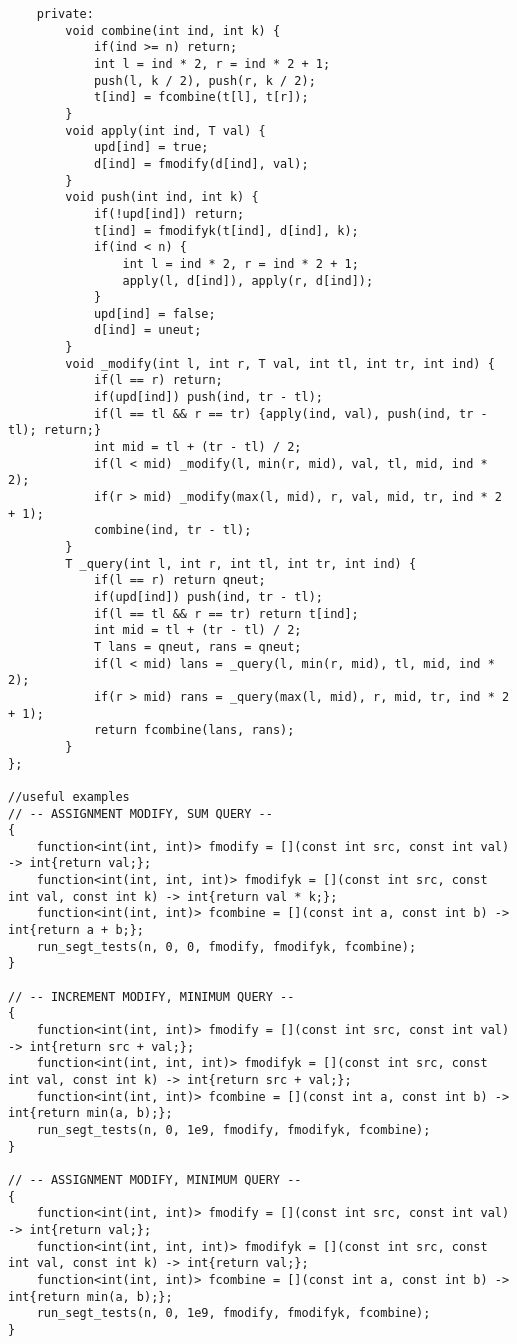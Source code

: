 \documentclass[8pt, headheight=10pt, a4paper]{article}
\begin{document}
\begin{multicols*}{3}
\begin{lstlisting}
    private:
        void combine(int ind, int k) {
            if(ind >= n) return;
            int l = ind * 2, r = ind * 2 + 1;
            push(l, k / 2), push(r, k / 2);
            t[ind] = fcombine(t[l], t[r]);
        }
        void apply(int ind, T val) {
            upd[ind] = true;
            d[ind] = fmodify(d[ind], val);
        }
        void push(int ind, int k) {
            if(!upd[ind]) return;
            t[ind] = fmodifyk(t[ind], d[ind], k);
            if(ind < n) {
                int l = ind * 2, r = ind * 2 + 1;
                apply(l, d[ind]), apply(r, d[ind]);
            }
            upd[ind] = false;
            d[ind] = uneut;
        }
        void _modify(int l, int r, T val, int tl, int tr, int ind) {
            if(l == r) return;
            if(upd[ind]) push(ind, tr - tl);
            if(l == tl && r == tr) {apply(ind, val), push(ind, tr - tl); return;}
            int mid = tl + (tr - tl) / 2;
            if(l < mid) _modify(l, min(r, mid), val, tl, mid, ind * 2);
            if(r > mid) _modify(max(l, mid), r, val, mid, tr, ind * 2 + 1);
            combine(ind, tr - tl);
        }
        T _query(int l, int r, int tl, int tr, int ind) {
            if(l == r) return qneut;
            if(upd[ind]) push(ind, tr - tl);
            if(l == tl && r == tr) return t[ind];
            int mid = tl + (tr - tl) / 2;
            T lans = qneut, rans = qneut;
            if(l < mid) lans = _query(l, min(r, mid), tl, mid, ind * 2);
            if(r > mid) rans = _query(max(l, mid), r, mid, tr, ind * 2 + 1);
            return fcombine(lans, rans);
        }
};

//useful examples
// -- ASSIGNMENT MODIFY, SUM QUERY --
{
    function<int(int, int)> fmodify = [](const int src, const int val) -> int{return val;};
    function<int(int, int, int)> fmodifyk = [](const int src, const int val, const int k) -> int{return val * k;};
    function<int(int, int)> fcombine = [](const int a, const int b) -> int{return a + b;};
    run_segt_tests(n, 0, 0, fmodify, fmodifyk, fcombine);
}

// -- INCREMENT MODIFY, MINIMUM QUERY --
{
    function<int(int, int)> fmodify = [](const int src, const int val) -> int{return src + val;};
    function<int(int, int, int)> fmodifyk = [](const int src, const int val, const int k) -> int{return src + val;};
    function<int(int, int)> fcombine = [](const int a, const int b) -> int{return min(a, b);};
    run_segt_tests(n, 0, 1e9, fmodify, fmodifyk, fcombine);
}

// -- ASSIGNMENT MODIFY, MINIMUM QUERY --
{
    function<int(int, int)> fmodify = [](const int src, const int val) -> int{return val;};
    function<int(int, int, int)> fmodifyk = [](const int src, const int val, const int k) -> int{return val;};
    function<int(int, int)> fcombine = [](const int a, const int b) -> int{return min(a, b);};
    run_segt_tests(n, 0, 1e9, fmodify, fmodifyk, fcombine);
}
\end{lstlisting}


\end{multicols*}
\end{document}
